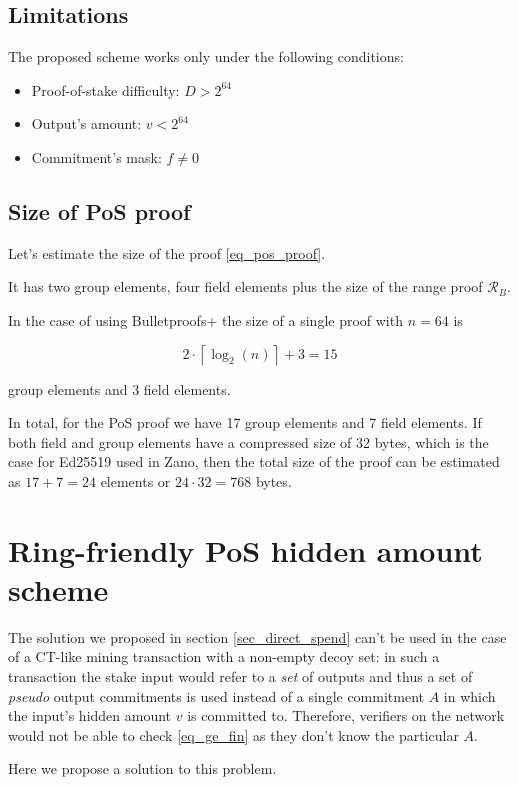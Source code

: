 \documentclass{article}
\newcommand{\ceil}[1]{\left\lceil #1 \right\rceil}
\numberwithin{figure}{section}
\begin{document}
\subsection{Limitations} \label{s_limitations}

The proposed scheme works only under the following conditions:
\begin{itemize}
    \item Proof-of-stake difficulty: $D > 2^{64}$
    \item Output's amount: $v < 2^{64}$
    \item Commitment's mask: $f \neq 0$
\end{itemize}

\subsection{Size of PoS proof}

Let's estimate the size of the proof \eqref{eq_pos_proof}.

It has two group elements, four field elements plus the size of the range proof $\mathcal{R}_B$.

In the case of using Bulletproofs+ \cite{BP+} the size of a single proof with $n = 64$ is 

\[2 \cdot \ceil{\log_2(n)} + 3 = 15\]

group elements and 3 field elements.

In total, for the PoS proof we have 17 group elements and 7 field elements. If both field and group elements have a compressed size of 32 bytes, which is the case for Ed25519 used in Zano, then the total size of the proof can be estimated as $17+7=24$ elements or $24 \cdot 32 = 768$ bytes.


\section{Ring-friendly PoS hidden amount scheme}

The solution we proposed in section \ref{sec_direct_spend} can't be used in the case of a CT-like mining transaction with a non-empty decoy set: in such a transaction the stake input would refer to a \textit{set} of outputs and thus a set of \textit{pseudo} output commitments is used instead of a single commitment $A$ in which the input's hidden amount $v$ is committed to. Therefore, verifiers on the network would not be able to check \eqref{eq_ge_fin} as they don't know the particular $A$. 

Here we propose a solution to this problem.
\end{document}
